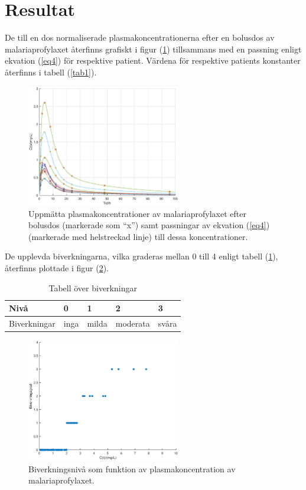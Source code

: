 \documentclass[a4paper,11pt]{article}
\begin{document}
\section{Resultat}
De till en dos normaliserade plasmakoncentrationerna efter en bolusdos av malariaprofylaxet återfinns grafiskt i figur (\ref{fig1}) tillsammans med en passning enligt ekvation (\ref{eq4}) för respektive patient. Värdena för respektive patients konstanter återfinns i tabell (\ref{tab1}).
\begin{figure}[H]
\centering
\includegraphics[width=0.6\textwidth]{fig1.eps}
\caption{\label{fig1}Uppmätta plasmakoncentrationer av malariaprofylaxet efter bolusdos (markerade som ``x'') samt passningar av ekvation (\ref{eq4}) (markerade med helstreckad linje) till dessa koncentrationer.}
\end{figure}
De upplevda biverkningarna, vilka graderas mellan 0 till 4 enligt tabell (\ref{tab2}), återfinns plottade i figur (\ref{fig2}).
\begin{table}[H]
\centering
\caption{Tabell över biverkningar}
\label{tab2}
\begin{tabular}{l|llll}
Nivå         & 0    & 1     & 2        & 3     \\ \hline
Biverkningar & inga & milda & moderata & svåra
\end{tabular}
\end{table}
\begin{figure}[H]
\centering
\includegraphics[width=0.6\textwidth]{fig2.eps}
\caption{\label{fig2}Biverkningsnivå som funktion av plasmakoncentration av malariaprofylaxet.}
\end{figure}
\end{document}
